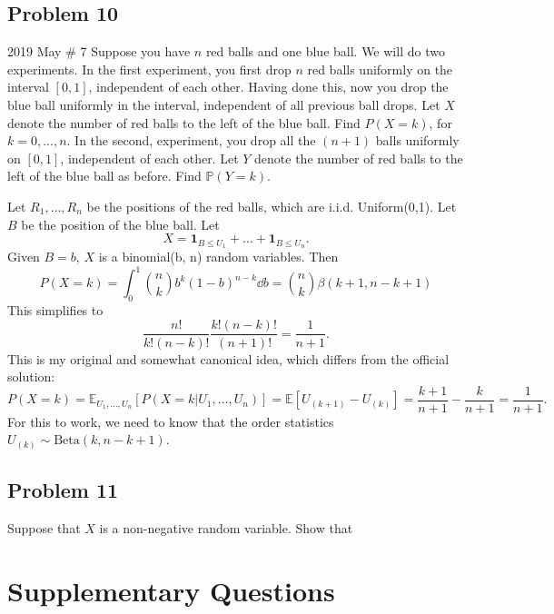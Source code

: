 \documentclass[../main]{subfiles}
\begin{document}
\subsection{Problem 10}
\begin{bbox}{2019 May \# 7}
    Suppose you have $n$ red balls and one blue ball. We will do two experiments. In the first experiment, you first drop $n$ red balls uniformly on the interval $[0,1]$, independent of each other. Having done this, now you drop the blue ball uniformly in the interval, independent of all previous ball drops. Let $X$ denote the number of red balls to the left of the blue ball. Find $P(X=k)$, for $k=0,...,n$.
    \newline
    In the second, experiment, you drop all the $(n+1)$ balls uniformly on $[0,1]$, independent of each other. Let $Y$ denote the number of red balls to the left of the blue ball as before. Find $\mathbb P(Y=k).$
\end{bbox}
\begin{solution}
    Let $R_1,\dots, R_n$ be the positions of the red balls, which are i.i.d. Uniform(0,1). Let $B$ be the position of the blue ball. Let 
    \[
    X = \mathbf{1}_{B\le U_1} + \dots + \mathbf{1}_{B\le U_n}.
    \]
    Given $B=b$, $X$ is a binomial(b, n) random variables. Then
    \[
    P(X=k) = \int_{0}^1 \binom{n}{k}b^{k}(1-b)^{n-k}\dd b = \binom{n}{k} \beta(k+1, n-k+1)
    \]
    This simplifies to
    \[
    \frac{n!}{k!(n-k)!}\frac{k!(n-k)!}{(n+1)!} = \frac{1}{n+1}.
    \]
    This is my original and somewhat canonical idea, which differs from the official solution:
    \[
    P(X=k)=\mathbb E_{U_1,\dots,U_n}[P(X=k|U_1,\dots, U_n)] = \mathbb E[U_{(k+1)}-U_{(k)}] = \frac{k+1}{n+1}-\frac{k}{n+1} = \frac{1}{n+1}.
    \]
    For this to work, we need to know that the order statistics $U_{(k)} \sim \text{Beta}(k, n-k+1)$.
\end{solution}
\subsection{Problem 11}
\begin{bbox}
    Suppose that $X$ is a non-negative random variable. Show that
\end{bbox}
\section{Supplementary Questions}
\end{document}

